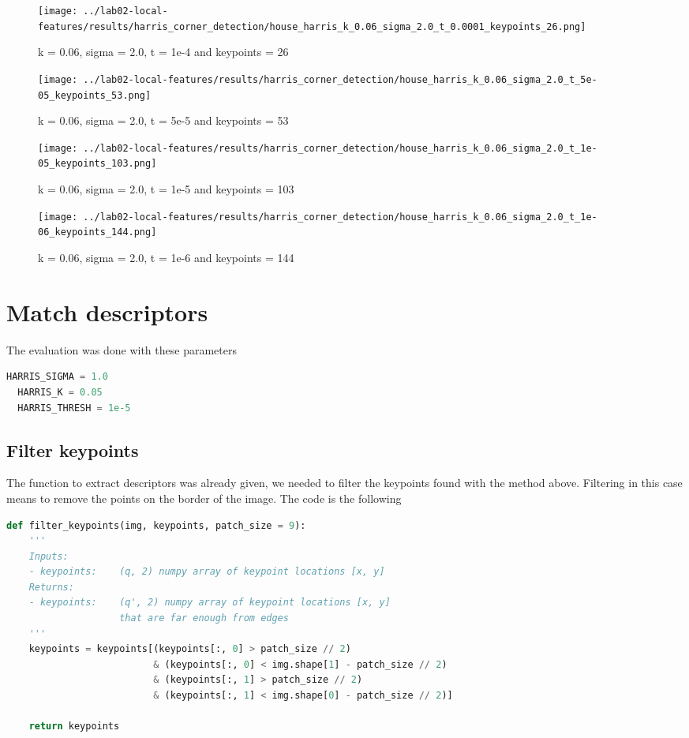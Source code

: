 \documentclass{ETHExercise}
\begin{document}
\begin{figure}[!htb]
      \texttt{[image: ../lab02-local-features/results/harris\_corner\_detection/house\_harris\_k\_0.06\_sigma\_2.0\_t\_0.0001\_keypoints\_26.png]}
      \caption{k = 0.06, sigma = 2.0, t = 1e-4 and keypoints = 26}
    \endminipage\hfill
      \texttt{[image: ../lab02-local-features/results/harris\_corner\_detection/house\_harris\_k\_0.06\_sigma\_2.0\_t\_5e-05\_keypoints\_53.png]}
      \caption{k = 0.06, sigma = 2.0, t = 5e-5 and keypoints = 53}
    \endminipage\hfill
      \texttt{[image: ../lab02-local-features/results/harris\_corner\_detection/house\_harris\_k\_0.06\_sigma\_2.0\_t\_1e-05\_keypoints\_103.png]}
      \caption{k = 0.06, sigma = 2.0, t = 1e-5 and keypoints = 103}
    \endminipage\hfill
      \texttt{[image: ../lab02-local-features/results/harris\_corner\_detection/house\_harris\_k\_0.06\_sigma\_2.0\_t\_1e-06\_keypoints\_144.png]}
      \caption{k = 0.06, sigma = 2.0, t = 1e-6 and keypoints = 144}
    \endminipage
  \end{figure}


\newpage
\section{Match descriptors}
The evaluation was done with these parameters
\begin{lstlisting}[language=Python, caption=parameters used to match descriptors]
  HARRIS_SIGMA = 1.0
  HARRIS_K = 0.05
  HARRIS_THRESH = 1e-5
\end{lstlisting}

\subsection{Filter keypoints}
The function to extract descriptors was already given, we needed to filter the keypoints 
found with the method above. Filtering in this case means to remove the points on the border of the image.
The code is the following
\begin{lstlisting}[language=Python, caption=filter keypoints]
  def filter_keypoints(img, keypoints, patch_size = 9):
    '''
    Inputs:
    - keypoints:    (q, 2) numpy array of keypoint locations [x, y]
    Returns:
    - keypoints:    (q', 2) numpy array of keypoint locations [x, y] 
                    that are far enough from edges
    '''
    keypoints = keypoints[(keypoints[:, 0] > patch_size // 2) 
                          & (keypoints[:, 0] < img.shape[1] - patch_size // 2) 
                          & (keypoints[:, 1] > patch_size // 2) 
                          & (keypoints[:, 1] < img.shape[0] - patch_size // 2)]
    
    return keypoints
\end{lstlisting}
\end{document}
